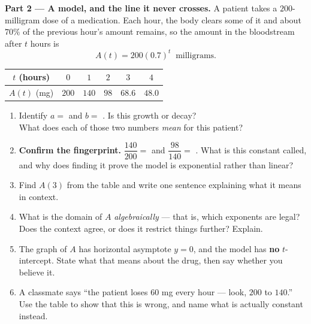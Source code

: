 \documentclass[10pt]{article}
\begin{document}
\begin{tcolorbox}[colback=white, colframe=black!40, title=\textbf{Tier E --- Extension},
    fonttitle=\bfseries, arc=1.5mm, left=3mm, right=3mm, top=2mm, bottom=2mm, breakable]
\vspace{5pt}
\textbf{Part 2 --- A model, and the line it never crosses.} A patient takes a $200$-milligram dose of
a medication. Each hour, the body clears some of it and about $70\%$ of the previous hour's amount
remains, so the amount in the bloodstream after $t$ hours is
\[
  A(t) = 200(0.7)^{t} \ \text{ milligrams.}
\]
\begin{center}
\renewcommand{\arraystretch}{1.25}
\begin{tabular}{|c|c|c|c|c|c|}
\hline
$t$ (hours) & $0$ & $1$ & $2$ & $3$ & $4$ \\ \hline
$A(t)$ (mg) & $200$ & $140$ & $98$ & $68.6$ & $48.0$ \\ \hline
\end{tabular}
\end{center}
\begin{enumerate}[label=(\alph*), leftmargin=1.9em, itemsep=6pt]
  \item Identify $a=$ \blank{1.6cm} and $b=$ \blank{1.6cm}. Is this growth or decay?
        \blank{2.0cm} \\
        What does each of those two numbers \emph{mean} for this patient? 
  \item \textbf{Confirm the fingerprint.} $\dfrac{140}{200}=$ \blank{1.4cm} and
        $\dfrac{98}{140}=$ \blank{1.4cm}. \; What is this constant called, and why does finding it
        prove the model is exponential rather than linear? 
  \item Find $A(3)$ from the table and write one sentence explaining what it means in context.
  \item What is the domain of $A$ \emph{algebraically} --- that is, which exponents are legal?
        \blank{3.0cm} \\
        Does the context agree, or does it restrict things further? Explain. 
  \item The graph of $A$ has horizontal asymptote $y=0$, and the model has \textbf{no}
        $t$-intercept. State what that means about the drug, then say whether you believe it.
  \item A classmate says ``the patient loses $60$ mg every hour --- look, $200$ to $140$.'' Use the
        table to show that this is wrong, and name what is actually constant instead.
\end{enumerate}
\end{tcolorbox}
\end{document}
